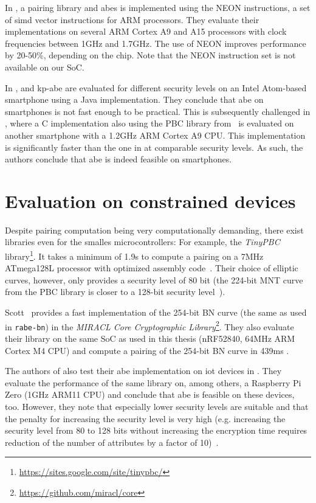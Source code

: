 In \cite{sanchez_neon_2013}, a pairing library and \acrshort{abes} is implemented using the NEON instructions, a set of \acrshort{simd} vector instructions for ARM processors.
They evaluate their implementations on several ARM Cortex A9 and A15 processors with clock frequencies between 1GHz and 1.7GHz.
The use of NEON improves performance by 20-50\%, depending on the chip.
Note that the NEON instruction set is not available on our SoC. %

In \cite{wang_performance_2014},  and \acrshort{kp-abe} are evaluated for different security levels on an Intel Atom-based smartphone using a Java implementation.
They conclude that \acrshort{abe} on smartphones is not fast enough to be practical.
This is subsequently challenged in \cite{ambrosin_feasibility_2015}, where a C implementation also using the PBC library from~\cite{lynn_implementation_2007} is evaluated on another smartphone with a 1.2GHz ARM Cortex A9 CPU.
This implementation is significantly faster than the one in \cite{wang_performance_2014} at comparable security levels.
As such, the authors conclude that \acrshort{abe} is indeed feasible on smartphones.

\section{Evaluation on constrained devices}

Despite pairing computation being very computationally demanding, there exist libraries even for the smalles microcontrollers:
For example, the \emph{TinyPBC} library\footnote{\url{https://sites.google.com/site/tinypbc/}}.
It takes a minimum of 1.9s to compute a pairing on a 7MHz ATmega128L processor with optimized assembly code~\cite{oliveira_tinypbc_2011}. 
Their choice of elliptic curves, however, only provides a security level of 80 bit (the 224-bit MNT curve from the PBC library is closer to a 128-bit security level~\cite{akinyele_self-protecting_2010}).

Scott~\cite{scott_deployment_2020} provides a fast implementation of the 254-bit BN curve (the same as used in \texttt{rabe-bn}) in the \emph{MIRACL Core Cryptographic Library}\footnote{\url{https://github.com/miracl/core}}.
They also evaluate their library on the same SoC as used in this thesis (nRF52840, 64MHz ARM Cortex M4 CPU) and compute a pairing of the 254-bit BN curve in 439ms \cite[Table~4]{scott_deployment_2020}.


The authors of \cite{ambrosin_feasibility_2015} also test their \acrshort{abe} implementation on \gls{iot} devices in \cite{ambrosin_feasibility_2016}.
They evaluate the performance of the same library on, among others, a Raspberry Pi Zero (1GHz ARM11 CPU) and conclude that \acrshort{abe} is feasible on these devices, too.
However, they note that especially lower security levels are suitable and that the penalty for increasing the security level is very high (e.g. increasing the security level from 80 to 128 bits without increasing the encryption time requires reduction of the number of attributes by a factor of 10)~\cite{ambrosin_feasibility_2016}.

